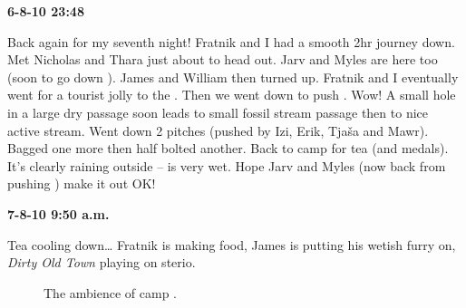 
\textbf{6-8-10 23:48}

Back again for my seventh night! Fratnik and I had a smooth 2hr journey
down. Met Nicholas and Thara just about to head out. Jarv and Myles are
here too (soon to go down ). James and William then turned up.  Fratnik and I eventually went for a tourist jolly to the
. Then we went down to push . Wow! A small
hole in a large dry passage soon leads to small fossil stream passage
then to nice active stream. Went down 2 pitches (pushed by Izi, Erik,
Tjaša and Mawr). Bagged one more then half bolted another. Back to camp
for tea (and medals). It's clearly raining outside --  is
very wet. Hope Jarv and Myles (now back from pushing ) make it out
OK!


\newpage
\textbf{7-8-10 9:50 a.m.}

Tea cooling down\ldots{} Fratnik is making food, James is putting his
wetish furry on, \textit{Dirty Old Town }playing on sterio.

\begin{figure}[t!]
\checkoddpage \ifoddpage \forcerectofloat \else \forceversofloat \fi
{}
\caption{The ambience of camp \protect{}. } \label{x-ray ambience}
\end{figure}

